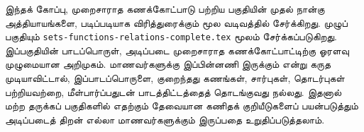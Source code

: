 \documentclass[../../include/open-logic-part]{subfiles}
\begin{document}

\begin{editorial}
இந்தக் கோப்பு, முறைசாராத கணக்கோட்பாடு பற்றிய பகுதியின்
முதல் நான்கு அத்தியாயங்களை, படிப்படியாக விரித்துரைக்கும்
மூல வடிவத்தில் சேர்க்கிறது. முழுப் பகுதியும்
\verb|sets-functions-relations-complete.tex| மூலம் சேர்க்கப்படுகிறது.
இப்பகுதியின் பாடப்பொருள், அடிப்படை முறைசாராத கணக்கோட்பாட்டிற்கு
ஓரளவு முழுமையான அறிமுகம். மாணவர்களுக்கு இப்பின்னணி
இருக்கும் என்று கருத முடியாவிட்டால், இப்பாடப்பொருளை,
குறைந்தது கணங்கள், சார்புகள், தொடர்புகள் பற்றியவற்றை,
மீள்பார்ப்பதுடன் பாடத்திட்டத்தைத் தொடங்குவது நல்லது.
இதனால் மற்ற தருக்கப் பகுதிகளில் எதற்கும் தேவையான
கணிதக் குறியீடுகளைப் பயன்படுத்தும் அடிப்படைத் திறன்
எல்லா மாணவர்களுக்கும் இருப்பதை உறுதிப்படுத்தலாம்.
\end{editorial}





\OLEndPartHook
\end{document}
